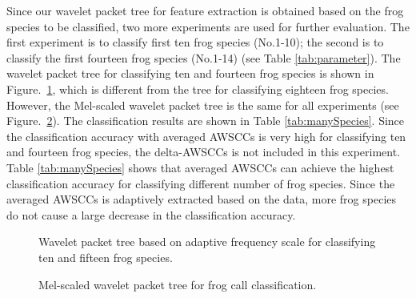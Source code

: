 Since our wavelet packet tree for feature extraction is obtained based on the frog species to be classified, two more experiments are used for further evaluation. The first experiment is to classify first ten frog species (No.1-10); the second is to classify the first fourteen frog species (No.1-14) (see Table \ref{tab:parameter}). The wavelet packet tree for classifying ten and fourteen frog species is shown in Figure.~\ref{fig:wpTree}, which is different from the tree for classifying eighteen frog species. However, the Mel-scaled wavelet packet tree is the same for all experiments (see Figure.~\ref{fig:melTree}). The classification results are shown in Table \ref{tab:manySpecies}. Since the classification accuracy with averaged AWSCCs is very high for classifying ten and fourteen frog species, the delta-AWSCCs is not included in this experiment. Table \ref{tab:manySpecies} shows that averaged AWSCCs can achieve the highest classification accuracy for classifying different number of frog species. Since the averaged AWSCCs is adaptively extracted based on the data, more frog species do not cause a large decrease in the classification accuracy.  



\begin{figure}[htb!] %
\caption{Wavelet packet tree based on adaptive frequency scale for classifying ten and fifteen frog species.}
\label{fig:wpTree} 
\end{figure}


\begin{figure}[htb!] %
\caption{Mel-scaled wavelet packet tree for frog call classification.}
\label{fig:melTree} 
\end{figure}


